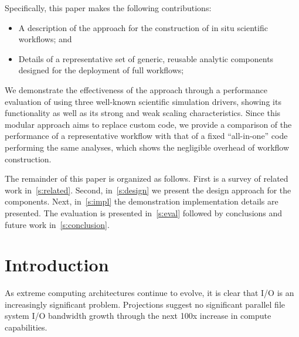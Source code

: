 
Specifically, this paper makes the following contributions:
\begin{itemize}
\item A description of the \sys approach
  for the construction
  of in situ scientific workflows; and
\item Details of a representative set of \insitu generic,
  reusable analytic components designed for the deployment
  of full \sys workflows;
\end{itemize}

We demonstrate the effectiveness of the approach through
a performance evaluation of \sys using three
well-known scientific simulation
drivers, showing its functionality as well as
its strong and weak scaling
characteristics. Since this modular approach aims to
replace custom code, we provide a comparison of
the performance of a representative \sys workflow with
that of a fixed ``all-in-one'' code performing the same analyses,
which shows the negligible overhead of \sys workflow construction.

The remainder of this paper is organized as follows.
First is a survey of related
work in~\autoref{s:related}.
Second, in~\autoref{s:design} we present the design
approach for the components.
Next, in~\autoref{s:impl} the demonstration implementation details
are presented. The evaluation is presented in~\autoref{s:eval} followed
by conclusions and future work in~\autoref{s:conclusion}.


\section{Introduction}
\label{s:intro}

As extreme computing architectures continue to evolve, it is 
clear that I/O is an increasingly significant problem.  Projections suggest no
significant parallel file system I/O bandwidth growth through the next 100x
increase in compute capabilities.

